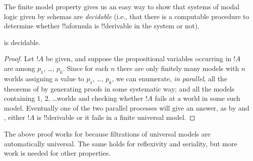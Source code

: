 \documentclass[../../../include/open-logic-section]{subfiles}
\begin{document}

The finite model property gives us an easy way to show that systems of
modal logic given by schemas are \emph{decidable} (i.e., that there is
a computable procedure to determine whether !!a{formula} is !!{derivable} in
the system or not).

\begin{thm}
   is decidable.
\end{thm}

\begin{proof}
  Let $!A$ be given, and suppose the propositional variables
  occurring in $!A$ are among $p_1$, \dots, $p_k$.  Since for each
  $n$ there are only finitely many models with $n$ worlds assigning a
  value to $p_1$, \dots, $p_k$, we can enumerate, \emph{in parallel}, all
  the theorems of  by generating proofs in some systematic
  way; and all the models containing $1$, $2$, \dots worlds and checking
  whether $!A$ fails at a world in some such model. Eventually
  one of the two parallel processes will give an answer, as by
   and , either
  $!A$ is !!{derivable} or it fails in a finite universal model.
\end{proof}

The above proof works for  because filtrations of universal
models are automatically universal. The same holds for reflexivity and
seriality, but more work is needed for other properties.
\end{document}

